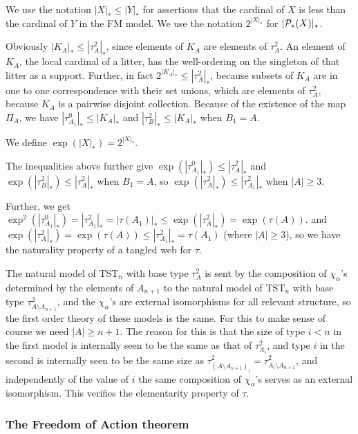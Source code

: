 \documentclass[12pt]{article}
\begin{document}
We use the notation $|X|_* \leq |Y|_*$ for assertions that the cardinal of $X$ is less than the cardinal of $Y$ in the FM model.  We use the notation $2^{|X|_*}$ for $|{\cal P}_*(X)|_*$.

Obviously $|K_A|_* \leq |\tau^2_A|_*$, since elements of $K_A$ are elements of $\tau^2_A$.  An element of $K_A$, the local cardinal of a litter, has the well-ordering on the singleton of that litter
as a support.  Further, in fact $2^{|K_A|_*} \leq |\tau^2_A|_*$, because subsets of $K_A$ are in one to one correspondence with their set unions, which are elements of
$\tau^2_A$, because $K_A$ is a pairwise disjoint collection.  Because of the existence of the map $\Pi_A$, we have $|\tau^0_{A_1}|_* \leq |K_A|_*$ and
$|\tau^2_B|_* \leq |K_A|_*$ when $B_1=A$.  

We define $\exp(|X|_*) = 2^{|X|_*}$.

The inequalities above further give $\exp(|\tau^0_{A_1}|_*) \leq |\tau^2_A|_*$ and $\exp(|\tau^2_B|_*) \leq |\tau^2_A|_*$ when $B_1=A$, so $\exp(|\tau^2_{A}|_*) \leq |\tau^2_{A_1}|_*$ when $|A|\geq 3$.

Further, we get $\exp^2(|\tau^0_{A_1}|_*) = |\tau^2_{A_1}|_* = |\tau(A_1)|_* \leq \exp(|\tau^2_A|_*) = \exp(\tau(A))$.
and $\exp(|\tau^2_{A}|_*) = \exp(\tau(A)) \leq |\tau^2_{A_1}|_* = \tau(A_1)$ (where $|A| \geq 3$), so we have the naturality property of a tangled web for $\tau$.

The natural model of TST$_n$ with base type $\tau^2_A$ is sent by the composition of $\chi_\alpha$'s determined by the elements of $A_{n+1}$
to the natural model of TST$_n$ with base type $\tau^2_{A \setminus A_{n+1}}$, and the $\chi_\alpha$'s are external isomorphisms for all relevant structure, so the first order theory of these models is the same.  For this to make sense of course we need $|A| \geq n+1$.
The reason for this is that the size of type $i<n$ in the first model is internally seen to be the same as that of $\tau^2_{A_i}$, and type $i$ in the  second is internally seen to be the same size
as  $\tau^2_{(A \setminus A_{n+1})_i} = \tau^2_{A_i \setminus A_{n+1}}$, and independently of the value of $i$ the same composition of $\chi_\alpha$'s serves as an external isomorphism.
This verifies the elementarity property of $\tau$.

\newpage

\subsubsection{The Freedom of Action theorem}
\end{document}
